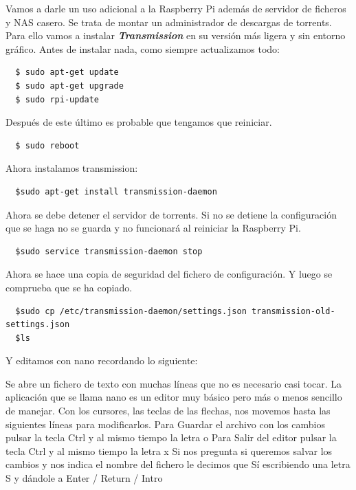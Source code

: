 \documentclass{article}
\begin{document}
Vamos a darle un uso adicional a la Raspberry Pi además de servidor de ficheros y NAS casero. Se trata de montar un administrador de descargas de torrents. Para ello vamos a instalar \textbf{\textit{Transmission}} en su versión más ligera y sin entorno gráfico. Antes de instalar nada, como siempre actualizamos todo:

\begin{verbatim}
  $ sudo apt-get update
  $ sudo apt-get upgrade
  $ sudo rpi-update

\end{verbatim}

Después de este último es probable que tengamos que reiniciar.

\begin{verbatim}
  $ sudo reboot

\end{verbatim}

Ahora instalamos transmission:

\begin{verbatim}
  $sudo apt-get install transmission-daemon

\end{verbatim}

Ahora se debe detener el servidor de torrents. Si no se detiene la configuración que se haga no se guarda y no funcionará al reiniciar la Raspberry Pi.

\begin{verbatim}
  $sudo service transmission-daemon stop

\end{verbatim}

Ahora se hace una copia de seguridad del fichero de configuración. Y luego se comprueba que se ha copiado.

\begin{verbatim}
  $sudo cp /etc/transmission-daemon/settings.json transmission-old-settings.json
  $ls

\end{verbatim}

Y editamos con nano recordando lo siguiente:

Se abre un fichero de texto con muchas líneas que no es necesario casi tocar. La aplicación que se llama nano es un editor muy básico pero más o menos sencillo de manejar. Con los cursores, las teclas de las flechas, nos movemos hasta las siguientes líneas para modificarlos.
Para Guardar el archivo con los cambios pulsar la tecla Ctrl y al mismo tiempo la letra o
Para Salir del editor pulsar la tecla Ctrl y al mismo tiempo la letra x
Si nos pregunta si queremos salvar los cambios y nos indica el nombre del fichero le decimos que Sí escribiendo una letra S y dándole a Enter / Return / Intro
\end{document}

